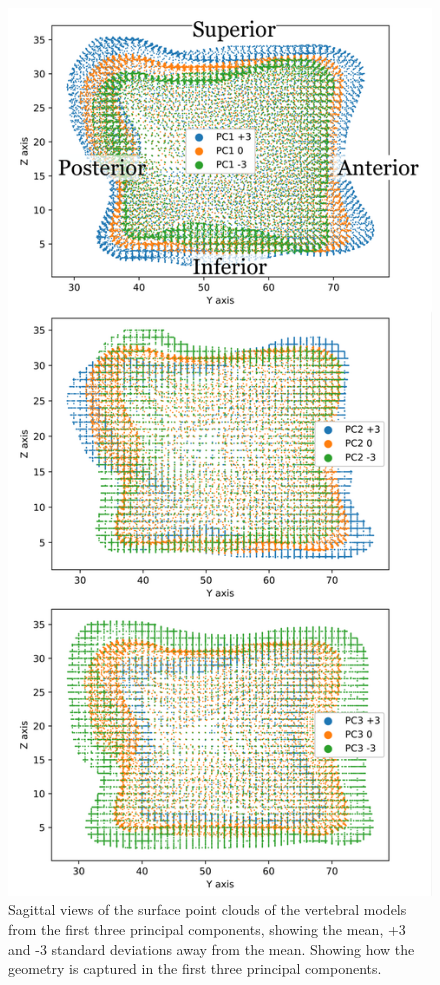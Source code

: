 \begin{figure}[p]
  \centering
  \includegraphics[width=.65\textwidth]{Chapters/Chapter_PCA_images/PC1_2_3_Sagital.pdf}
  \caption{Sagittal views of the surface point clouds of the vertebral models from the first three principal components, showing the mean, +3 and -3 standard deviations away from the mean. Showing how the geometry is captured in the first three principal components.}
  \label{fig:PC1_2_3_Sagital}
\end{figure}

